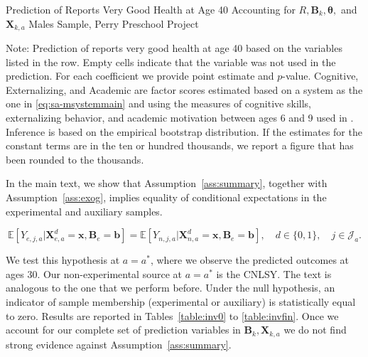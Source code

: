 \begin{table}
\begin{threeparttable}
\caption{Prediction of Reports Very Good Health at Age 40 Accounting for $R, \bm{B}_k, \bm{\theta},$ and $\bm{X}_{k,a}$ Males Sample, Perry Preschool Project}
\label{table:perry3}
\centering
\scriptsize

\begin{tablenotes}
\footnotesize
\item Note: Prediction of reports very good health at age 40 based on the variables listed in the row. Empty cells indicate that the variable was not used in the prediction. For each coefficient we provide point estimate and $p$-value. Cognitive, Externalizing, and Academic are factor scores estimated based on a system as the one in \eqref{eq:sa-msystemmain} and using the measures of cognitive skills, externalizing behavior, and academic motivation between ages 6 and 9 used in \citet{Heckman_Pinto_etal_2013_PerryFactor}. Inference is based on the empirical bootstrap distribution. If the estimates for the constant terms are in the ten or hundred thousands, we report a figure that has been rounded to the thousands.
\end{tablenotes}
\end{threeparttable}
\end{table}

\noindent In the main text, we show that Assumption~\ref{ass:summary}, together with Assumption~\ref{ass:exog}, implies equality of conditional expectations in the experimental and auxiliary samples.

\begin{equation}\label{eq:withbetimplication}
\mathbb{E} \left[ Y_{e,j,a} | \bm{X}^d_{e,a} = \bm{x}, \bm{B}_e = \bm{b} \right] = \mathbb{E} \left[ Y_{n,j,a} | \bm{X}^d_{n,a} = \bm{x}, \bm{B}_e = \bm{b} \right], \quad d \in \{0,1\}, \quad j \in \mathcal{J}_a.
\end{equation}

\noindent We test this hypothesis at $a = a^*$, where we observe the predicted outcomes at ages 30. Our non-experimental source at $a = a^*$ is the CNLSY. The text is analogous to the one that we perform before. Under the null hypothesis, an indicator of sample membership (experimental or auxiliary) is statistically equal to zero. Results are reported in Tables~\ref{table:inv0} to \ref{table:invfin}. Once we account for our complete set of prediction variables in $\bm{B}_k, \bm{X}_{k,a}$ we do not find strong evidence against Assumption~\ref{ass:summary}.

